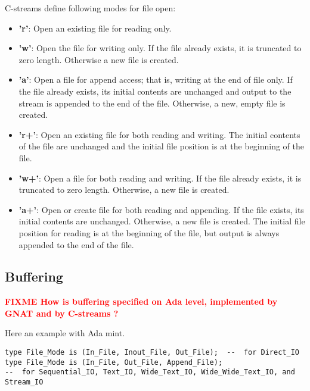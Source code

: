 \documentclass[a4paper,10pt]{article}
\newcommand{\fixme}[1]{\textbf{\textcolor{red}{FIXME #1}}}
\begin{document}
C-streams define following modes for file open:
\begin{itemize}
\item \textbf{'r'}: Open an existing file for reading only. 
\item \textbf{'w'}: Open the file for writing only. If the file already exists, it is truncated to zero length. Otherwise a new file is created. 
\item \textbf{'a'}: Open a file for append access; that is, writing at the end of file only. If the file already exists, its initial contents are unchanged and output to the stream is appended to the end of the file. Otherwise, a new, empty file is created. 
\item \textbf{'r+'}: Open an existing file for both reading and writing. The initial contents of the file are unchanged and the initial file position is at the beginning of the file. 
\item \textbf{'w+'}: Open a file for both reading and writing. If the file already exists, it is truncated to zero length. Otherwise, a new file is created. 
\item \textbf{'a+'}: Open or create file for both reading and appending. If the file exists, its initial contents are unchanged. Otherwise, a new file is created. The initial file position for reading is at the beginning of the file, but output is always appended to the end of the file. 
\end{itemize}




\subsection{Buffering}
\label{sec:webbrowser}

\fixme{How is buffering specified on Ada level, implemented by GNAT and by C-streams ?}

Here an example with Ada mint. 
\begin{verbatim}
type File_Mode is (In_File, Inout_File, Out_File);  --  for Direct_IO
type File_Mode is (In_File, Out_File, Append_File);
--  for Sequential_IO, Text_IO, Wide_Text_IO, Wide_Wide_Text_IO, and Stream_IO
\end{verbatim} 

%
\end{document}

